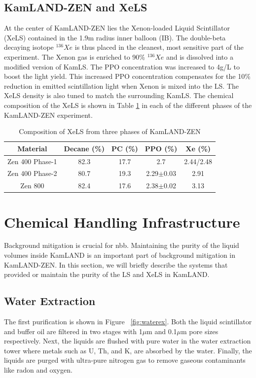\subsection{KamLAND-ZEN and XeLS}
At the center of KamLAND-ZEN lies the Xenon-loaded Liquid Scintillator (XeLS) contained in the 1.9m radius inner balloon (IB). The double-beta decaying isotope $^{136}Xe$ is thus placed in the cleanest, most sensitive part of the experiment. The Xenon gas is enriched to 90\% $^{136}Xe$ and is dissolved into a modified version of KamLS. The PPO concentration was increased to 4g/L to boost the light yield. This increased PPO concentration compensates for the 10\% reduction in emitted scintillation light when Xenon is mixed into the LS. The XeLS density is also tuned to match the surrounding KamLS. The chemical composition of the XeLS is shown in Table \ref{tbl:xels} in each of the different phases of the KamLAND-ZEN experiment.

\begin{table}[h]
	\centering
	\renewcommand{\arraystretch}{1.2}
	\begin{tabular}{c|cccc}
		\hline
		Material & Decane (\%) & PC (\%) & PPO (\%) & Xe (\%)\\ \hline
		Zen 400 Phase-1 & 82.3 & 17.7 & 2.7 & 2.44/2.48\\
		Zen 400 Phase-2 & 80.7 & 19.3 & 2.29$\pm$0.03 & 2.91\\
		Zen 800 & 82.4 & 17.6 & 2.38$\pm$0.02 & 3.13\\ \hline
	\end{tabular}
	\caption{Composition of XeLS from three phases of KamLAND-ZEN}
	\label{tbl:xels}
\end{table}

\section{Chemical Handling Infrastructure}
Background mitigation is crucial for \0nbb. Maintaining the purity of the liquid volumes inside KamLAND is an important part of background mitigation in KamLAND-ZEN. In this section, we will briefly describe the systems that provided or maintain the purity of the LS and XeLS in KamLAND.

\subsection{Water Extraction}
The first purification is shown in Figure ~\ref{fig:waterex}. Both the liquid scintillator and buffer oil are filtered in two stages with 1$\mu$m and 0.1$\mu$m pore sizes respectively. Next, the liquids are flushed with pure water in the water extraction tower where metals such as U, Th, and K, are absorbed by the water. Finally, the liquids are purged with ultra-pure nitrogen gas to remove gaseous contaminants like radon and oxygen.

